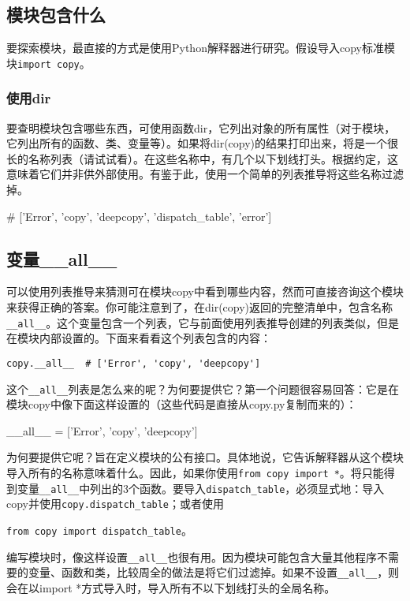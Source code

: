\subsection{模块包含什么}
要探索模块，最直接的方式是使用Python解释器进行研究。假设导入copy标准模块\verb|import copy|。
\subsubsection{使用dir}
要查明模块包含哪些东西，可使用函数dir，它列出对象的所有属性（对于模块，它列出所有的函数、类、变量等）。如果将dir(copy)的结果打印出来，将是一个很长的名称列表（请试试看）。在这些名称中，有几个以下划线打头。根据约定，这意味着它们并非供外部使用。有鉴于此，使用一个简单的列表推导将这些名称过滤掉。
\begin{pyc}
# ['Error', 'copy', 'deepcopy', 'dispatch_table', 'error']
\end{pyc}

\subsection{变量\_\_all\_\_}
可以使用列表推导来猜测可在模块copy中看到哪些内容，然而可直接咨询这个模块来获得正确的答案。你可能注意到了，在dir(copy)返回的完整清单中，包含名称\verb|__all__|。这个变量包含一个列表，它与前面使用列表推导创建的列表类似，但是在模块内部设置的。下面来看看这个列表包含的内容：

\verb|copy.__all__  # ['Error', 'copy', 'deepcopy']|

这个\verb|__all__|列表是怎么来的呢？为何要提供它？第一个问题很容易回答：它是在模块copy中像下面这样设置的（这些代码是直接从copy.py复制而来的）：

\begin{pyc}
__all__ = ['Error', 'copy', 'deepcopy']
\end{pyc}

为何要提供它呢？旨在定义模块的公有接口。具体地说，它告诉解释器从这个模块导入所有的名称意味着什么。因此，如果你使用\verb|from copy import *|。将只能得到变量\verb|__all__|中列出的3个函数。要导入\verb|dispatch_table|，必须显式地：导入copy并使用\verb|copy.dispatch_table|；或者使用

\verb|from copy import dispatch_table|。

编写模块时，像这样设置\verb|__all__|也很有用。因为模块可能包含大量其他程序不需要的变量、函数和类，比较周全的做法是将它们过滤掉。如果不设置\verb|__all__|，则会在以import *方式导入时，导入所有不以下划线打头的全局名称。

